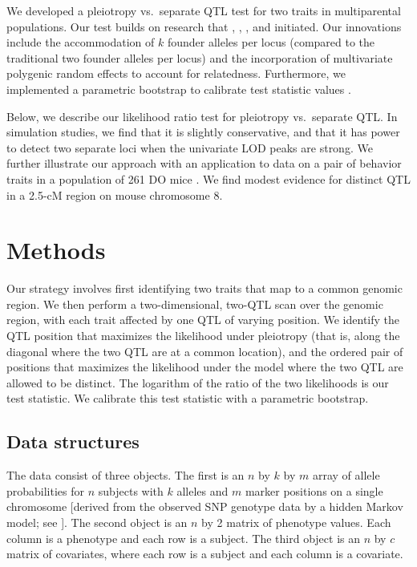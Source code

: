 \documentclass[12pt,twoside, lineno]{gsajnl}
\begin{document}
We developed a pleiotropy vs.\ separate QTL test for two traits in
multiparental populations. Our test builds on research that
\citet{jiang1995multiple}, \citet{knott2000multitrait},
\citet{tian2016dissection}, and \citet{zhou2014efficient} initiated.
Our innovations include the accommodation of $k$ founder alleles per
locus (compared to the traditional two founder alleles per locus) and
the incorporation of multivariate polygenic random effects to account
for relatedness. Furthermore, we implemented a parametric bootstrap to
calibrate test statistic values \citep{efron1979,tian2016dissection}.

Below, we describe our likelihood ratio test for pleiotropy vs.\
separate QTL. In simulation studies, we find that it is slightly
conservative, and that it has power to detect two separate loci when
the univariate LOD peaks are strong. We further illustrate our
approach with an application to data on a pair of behavior traits in
a population of 261 DO mice \citep{logan2013high,recla2014precise}.
We find modest evidence for distinct QTL in a 2.5-cM region on mouse
chromosome 8.


\section{Methods}
\label{sec:materials:methods}

Our strategy involves first identifying two traits that map to a common
genomic region. We then perform a two-dimensional, two-QTL scan over
the genomic region, with each trait affected by one QTL of varying
position. We identify the QTL position that maximizes the likelihood
under pleiotropy (that is, along the diagonal where the two QTL are at
a common location), and the ordered pair of positions that maximizes
the likelihood under the model where the two QTL are allowed to be
distinct. The logarithm of the ratio of the two likelihoods is our
test statistic. We calibrate this test statistic with a parametric
bootstrap.

\subsection{Data structures}

The data consist of three objects. The first is an $n$ by $k$ by $m$
array of allele probabilities for $n$ subjects with $k$ alleles and
$m$ marker positions on a single chromosome [derived from the observed
SNP genotype data by a hidden Markov model; see
\citet{broman2019rqtl2}]. The second object is an $n$ by 2 matrix of
phenotype values. Each column is a phenotype and each row is a
subject. The third object is an $n$ by $c$ matrix of covariates, where
each row is a subject and each column is a covariate.
\end{document}
